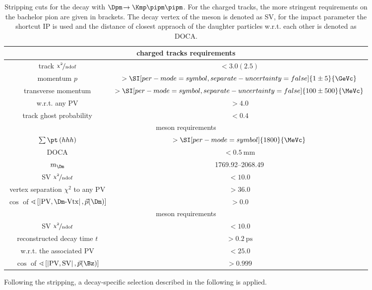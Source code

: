 \begin{table}[tbp]
	\centering
	\caption{Stripping cuts for the decay \BdToDpi with $\Dpm\!\to\Kmp\pipm\pipm$.
	For the charged tracks, the more stringent requirements on the bachelor pion are given in brackets.
	The decay vertex of the \Bz meson is denoted as \ac{SV}, for the impact parameter the shortcut IP is used and the distance of closest appraoch of the \Dm daughter particles w.r.t. each other is denoted as DOCA.}
	\begin{tabular}{cc}
		\toprule
		\multicolumn{2}{c}{charged tracks requirements}\\
		\midrule
		track $\nicefrac{\chi^2}{\text{ndof}}$		& $<3.0 (2.5)$ \\
		momentum $p$ 								& $>\SI[per-mode=symbol, separate-uncertainty=false]{1\pm5}{\GeVc}$ \\
		transverse momentum \pt 					& $>\SI[per-mode=symbol, separate-uncertainty=false]{100\pm500}{\MeVc}$ \\
		\chisqip w.r.t. any \ac{PV}				& $>4.0$ \\
		track ghost probability 					& $<0.4$ \\
		\midrule
		\multicolumn{2}{c}{\Dm meson requirements}\\
		\midrule
		$\sum \pt\left(hhh\right)$ 																				& $>\SI[per-mode=symbol]{1800}{\MeVc}$ \\
		DOCA 																									& $<\SI{0.5}{\milli\metre}$ \\
		$m_\Dm$ 																								& \SIrange[per-mode=symbol,range-units=single]{1769.92}{2068.49}{\MeVcc} \\
		\ac{SV} $\nicefrac{\chi^2}{\text{ndof}}$ 																	& $<10.0$ \\
		vertex separation $\chi^2$ to any \ac{PV} 																	& $>36.0$ \\
		$\cos$ of $\sphericalangle\left[\left|\text{PV},\Dm\text{-Vtx}\right|, \vec{p}\!\left(\Dm\right)\right]$	& $>0.0$ \\
		\midrule
		\multicolumn{2}{c}{\Bz meson requirements}\\
		\midrule
		\ac{SV} $\nicefrac{\chi^2}{\text{ndof}}$ 																& $<10.0$ \\
		reconstructed decay time $t$ 																			& $>\SI{0.2}{\pico\second}$ \\
		\chisqip w.r.t. the associated \ac{PV} 																& $<25.0$ \\
		$\cos$ of $\sphericalangle\left[\left|\text{PV},\text{SV}\right|, \vec{p}\!\left(\Bz\right)\right]$		& $>0.999$ \\
		\bottomrule
	\end{tabular}
	\label{tab:stripping}
\end{table}
Following the stripping, a decay-specific selection described in the following is applied.

